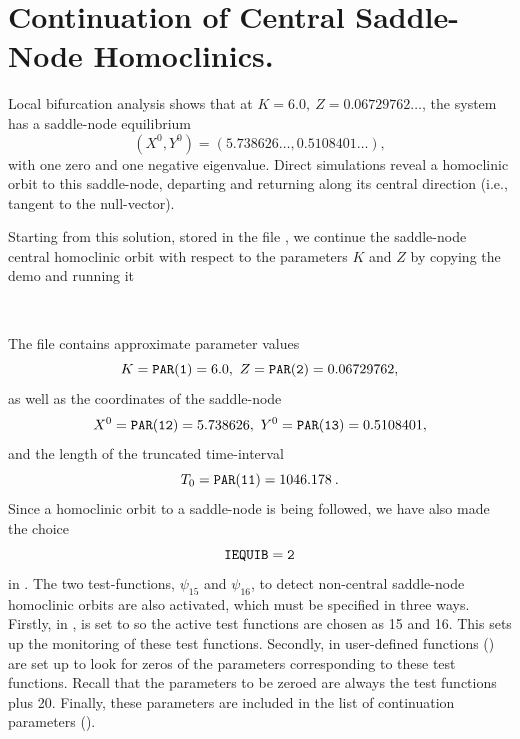 \documentclass[12pt]{report}
\begin{document}
\section{Continuation of Central Saddle-Node Homoclinics.}
Local bifurcation analysis shows that at $K=6.0,\ Z=0.06729762\ldots$,
the system has a saddle-node equilibrium 
$$
(X^0,Y^0) = (5.738626\ldots,0.5108401\ldots),
$$
with one zero and one negative eigenvalue. Direct simulations reveal a
homoclinic 
orbit to this saddle-node, departing and returning along its central
direction (i.e., tangent to the null-vector).
\par
Starting from this solution, stored in the file , we
continue the saddle-node central homoclinic orbit 
with respect to the parameters $K$ and $Z$ by copying the
demo and running it
\begin{center}
\\
\end{center}
The file  contains approximate
parameter values
$$
K=\parf{PAR(1)}=6.0,\ Z=\parf{PAR(2)}=0.06729762,
$$
as well as the coordinates of the saddle-node
$$
X^0=\parf{PAR(12)}=5.738626,\ Y^0=\parf{PAR(13)}=0.5108401,
$$
and the length of the truncated time-interval
$$
T_0={\tt PAR(11)} = 1046.178 \: .
$$
Since a homoclinic orbit to a saddle-node is being followed, we have also
made the choice
$$
{\tt IEQUIB = 2}
$$
in . The two test-functions, $\psi_{15}$ and $\psi_{16}$, 
to detect non-central saddle-node homoclinic
orbits are also activated, which must be specified in three ways. 
Firstly, in ,  is
set to \parf{[15,16]} so the active test functions
are chosen as 15 and 16. This sets up the monitoring of these
test functions. Secondly, in  user-defined functions
() are set up to look for zeros of the parameters
corresponding to these test functions. Recall that the
parameters to be zeroed are always the test functions plus 20.
Finally, these parameters are included in the list of continuation
parameters ().
\end{document}
